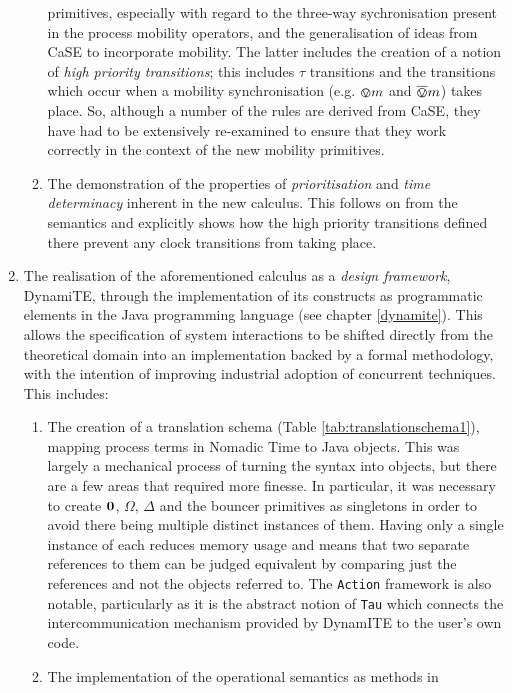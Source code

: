 \begin{enumerate}
\begin{enumerate}[\bfseries {C1.}1]
  primitives, especially with regard to the three-way sychronisation
  present in the process mobility operators, and the generalisation of
  ideas from CaSE to incorporate mobility.  The latter includes the
  creation of a notion of \emph{high priority transitions}; this
  includes $\tau$ transitions and the transitions which occur when a
  mobility synchronisation (e.g. $\varovee m$ and $\overline{\varovee}{m}$) takes
  place.  So, although a number of the rules are derived from CaSE,
  they have had to be extensively re-examined to ensure that they work
  correctly in the context of the new mobility primitives.
\item The demonstration of the properties of \emph{prioritisation} and
  \emph{time determinacy} inherent in the new calculus.  This follows
  on from the semantics and explicitly shows how the high priority
  transitions defined there prevent any clock transitions from taking
  place.
\end{enumerate}
\item The realisation of the aforementioned calculus as a \emph{design
  framework}, DynamiTE, through the implementation of its constructs
  as programmatic elements in the Java programming language (see
  chapter \ref{dynamite}).  This allows the specification of system
  interactions to be shifted directly from the theoretical domain into
  an implementation backed by a formal methodology, with the intention
  of improving industrial adoption of concurrent techniques.  This includes:
\begin{enumerate}[\bfseries {C2.}1]
\item The creation of a translation schema (Table
  \ref{tab:translationschema1}), mapping process terms in Nomadic Time
  to Java objects.  This was largely a mechanical process of turning
  the syntax into objects, but there are a few areas that required
  more finesse.  In particular, it was necessary to create $\textbf{0}$,
  $\Omega$, $\Delta$ and the bouncer primitives as singletons in order
  to avoid there being multiple distinct instances of them.  Having
  only a single instance of each reduces memory usage and means that
  two separate references to them can be judged equivalent by
  comparing just the references and not the objects referred to.  The
  \texttt{Action} framework is also notable, particularly as it is the
  abstract notion of \texttt{Tau} which connects the
  intercommunication mechanism provided by DynamITE to the user's own
  code.
\item The implementation of the operational semantics as methods in

\end{enumerate}
\end{enumerate}
